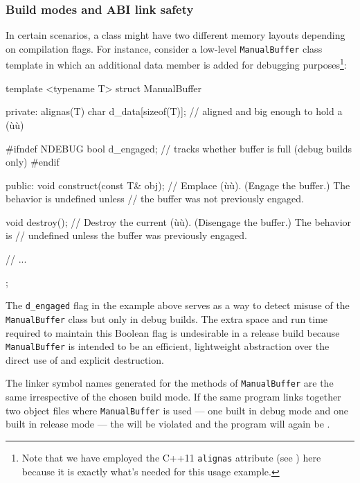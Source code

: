 \subsubsection[Build modes and ABI link safety]{Build modes and ABI link safety}\label{build-modes-and-abi-link-safety}

In certain scenarios, a class might have two different memory layouts
depending on compilation flags. For instance, consider a low-level
\lstinline!ManualBuffer! class template in which an additional data member
is added for debugging purposes{\cprotect\footnote{Note that we have
  employed the C++11 \lstinline!alignas! attribute (see )   
  here
  because it is exactly what's needed for this usage example.}}:

\begin{emcppslisting}
template <typename T>
struct ManualBuffer
{
private:
    alignas(T) char d_data[sizeof(T)];  // aligned and big enough to hold a (ù{}ù)

#ifndef NDEBUG
    bool d_engaged;  // tracks whether buffer is full (debug builds only)
#endif

public:
    void construct(const T& obj);
        // Emplace (ù{}ù). (Engage the buffer.) The behavior is undefined unless
        // the buffer was not previously engaged.

    void destroy();
        // Destroy the current (ù{}ù). (Disengage the buffer.) The behavior is
        // undefined unless the buffer was previously engaged.

    // ...
};
\end{emcppslisting}
    
\noindent The \lstinline!d_engaged! flag in the example above serves as a way to detect misuse of
the \mbox{\lstinline!ManualBuffer!} class but only in debug builds. The extra
space and run time required to maintain this Boolean flag is undesirable
in a release build because \mbox{\lstinline!ManualBuffer!} is intended to be an
efficient, lightweight abstraction over the direct use of
 and explicit destruction.

The linker symbol names generated for the methods of
\lstinline!ManualBuffer! are the same irrespective of the chosen build
mode. If the same program links together two object files where
\lstinline!ManualBuffer! is used --- one built in debug mode and one built
in release mode --- the  will be violated
and the program will again be .

